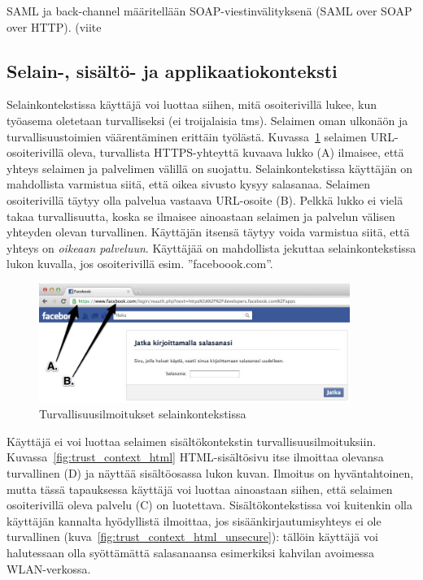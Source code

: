 \documentclass[finnish,gradu]{tktltiki}
\begin{document}
  SAML ja back-channel määritellään SOAP-viestinvälityksenä (SAML over SOAP over HTTP).
  (viite %



  \subsection{Selain-, sisältö- ja applikaatiokonteksti} %
  \label{sub:selainkonteksti_vs_applikaatiokonteksti}

  Selainkontekstissa käyttäjä voi luottaa siihen, mitä osoiterivillä lukee, kun työasema oletetaan turvalliseksi (ei troijalaisia tms). Selaimen oman ulkonäön ja turvallisuustoimien väärentäminen erittäin työlästä. Kuvassa~\ref{fig:facebook_reauth_ab} selaimen URL-osoiterivillä oleva, turvallista HTTPS-yhteyttä kuvaava lukko (A) ilmaisee, että yhteys selaimen ja palvelimen välillä on suojattu. Selainkontekstissa käyttäjän on mahdollista varmistua siitä, että oikea sivusto kysyy salasanaa. Selaimen osoiterivillä täytyy olla palvelua vastaava URL-osoite (B). Pelkkä lukko ei vielä takaa turvallisuutta, koska se ilmaisee ainoastaan selaimen ja palvelun välisen yhteyden olevan turvallinen. Käyttäjän itsensä täytyy voida varmistua siitä, että yhteys on \emph{oikeaan palveluun}. Käyttäjää on mahdollista jekuttaa selainkontekstissa lukon kuvalla, jos osoiterivillä esim. ''faceboook.com''.

  \begin{figure}
    \centering
    \includegraphics[width=0.9\textwidth]{images/Facebook_reauth_ab.jpg}
    \caption{Turvallisuusilmoitukset selainkontekstissa}
    \label{fig:facebook_reauth_ab}
  \end{figure}

  Käyttäjä ei voi luottaa selaimen sisältökontekstin turvallisuusilmoituksiin. Kuvassa~\ref{fig:trust_context_html} HTML-sisältösivu itse ilmoittaa olevansa turvallinen (D) ja näyttää sisältöosassa lukon kuvan. Ilmoitus on hyväntahtoinen, mutta tässä tapauksessa käyttäjä voi luottaa ainoastaan siihen, että selaimen osoiterivillä oleva palvelu (C) on luotettava. Sisältökontekstissa voi kuitenkin olla käyttäjän kannalta hyödyllistä ilmoittaa, jos sisäänkirjautumisyhteys ei ole turvallinen (kuva~\ref{fig:trust_context_html_unsecure}): tällöin käyttäjä voi halutessaan olla syöttämättä salasanaansa esimerkiksi kahvilan avoimessa WLAN-verkossa.
\end{document}
